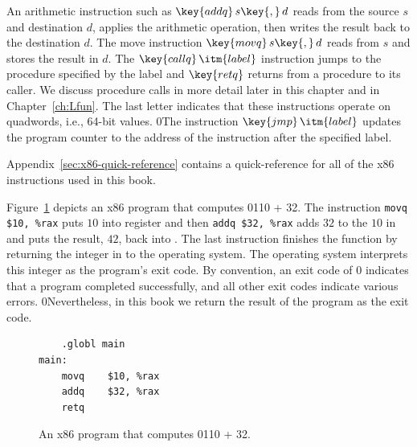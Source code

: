 \documentclass[7x10,nocrop]{TimesAPriori_MIT}%
\def\racketEd{0}
\def\pythonEd{1}
\def\edition{0}
\newcommand{\racket}[1]{{\if\edition\racketEd{#1}\fi}}
\newcommand{\python}[1]{{\if\edition\pythonEd #1\fi}}
\begin{document}
An arithmetic instruction such as $\key{addq}\,s\key{,}\,d$ reads from the
source $s$ and destination $d$, applies the arithmetic operation, then
writes the result back to the destination $d$. 
%
The move instruction $\key{movq}\,s\key{,}\,d$ reads from $s$ and
stores the result in $d$.
%
The $\key{callq}\,\itm{label}$ instruction jumps to the procedure
specified by the label and $\key{retq}$ returns from a procedure to
its caller. 
%
We discuss procedure calls in more detail later in this chapter and in
Chapter~\ref{ch:Lfun}.
%
The last letter  indicates that these instructions operate on
quadwords, i.e., 64-bit values.
%
\racket{The instruction $\key{jmp}\,\itm{label}$ updates the program
  counter to the address of the instruction after the specified
  label.}

Appendix~\ref{sec:x86-quick-reference} contains a quick-reference for
all of the x86 instructions used in this book.

Figure~\ref{fig:p0-x86} depicts an x86 program that computes
\racket{}\python{10 + 32}. The instruction
\lstinline{movq $10, %rax}
puts $10$ into register  and then \lstinline{addq $32, %rax}
adds $32$ to the $10$ in  and
puts the result, $42$, back into .
%
The last instruction  finishes the  function by
returning the integer in  to the operating system. The
operating system interprets this integer as the program's exit
code. By convention, an exit code of 0 indicates that a program
completed successfully, and all other exit codes indicate various
errors.
%
\racket{Nevertheless, in this book we return the result of the program
  as the exit code.}

\begin{figure}[tbp]
\begin{lstlisting}
	.globl main
main:
	movq	$10, %rax
	addq	$32, %rax
	retq
\end{lstlisting}
\caption{An x86 program that computes
  \racket{}\python{10 + 32}.}
\label{fig:p0-x86}
\end{figure}
\end{document}
